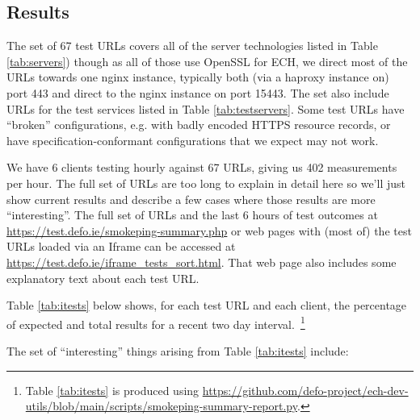 \subsection{Results}

The set of 67 test URLs covers all of the server technologies listed in Table
\ref{tab:servers}) though as all of those use OpenSSL for ECH, we direct most
of the URLs towards one nginx instance, typically both (via a haproxy instance
on) port 443 and direct to the nginx instance on port 15443. The set also
include URLs for the test services listed in Table \ref{tab:testservers}.  Some
test URLs have ``broken'' configurations, e.g. with badly encoded HTTPS
resource records, or have specification-conformant configurations that we
expect may not work.

We have 6 clients testing hourly against 67 URLs, giving us 402 measurements
per hour. The full set of URLs are too long to explain in detail here so
we'll just show current results and describe a few cases where those results
are more ``interesting''. The full set of URLs and the last 6 hours of test
outcomes at \url{https://test.defo.ie/smokeping-summary.php} or 
web pages with (most of) the test URLs loaded via an Iframe can be accessed at
\url{https://test.defo.ie/iframe_tests_sort.html}. That web page also includes
some explanatory text about each test URL.

Table \ref{tab:itests} below shows, for each test URL and each client,
the percentage of expected and total results for a recent two day
interval.~\footnote{Table \ref{tab:itests} is produced
using \url{https://github.com/defo-project/ech-dev-utils/blob/main/scripts/smokeping-summary-report.py}.}




The set of ``interesting'' things arising from Table \ref{tab:itests} include:


